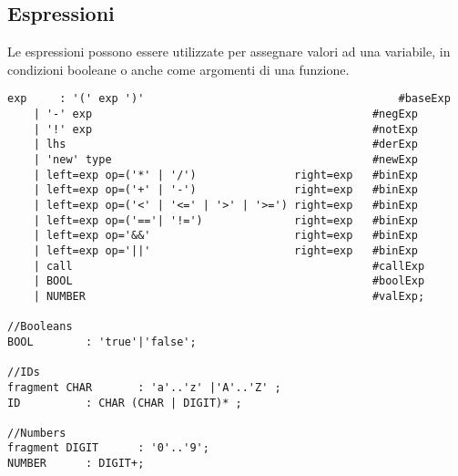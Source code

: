 \documentclass[../../main]{subfiles}
\begin{document}
\subsection{Espressioni}\label{s:espressioni}
Le espressioni possono essere utilizzate per assegnare valori ad una variabile, in condizioni booleane o anche come argomenti di una funzione.
\begin{lstlisting}[style=antlr]
exp	    : '(' exp ')'				                        #baseExp
    | '-' exp					                        #negExp
    | '!' exp                                           #notExp
    | lhs						                        #derExp
    | 'new' type					                    #newExp
    | left=exp op=('*' | '/')               right=exp   #binExp
    | left=exp op=('+' | '-')               right=exp   #binExp
    | left=exp op=('<' | '<=' | '>' | '>=') right=exp   #binExp
    | left=exp op=('=='| '!=')              right=exp   #binExp
    | left=exp op='&&'                      right=exp   #binExp
    | left=exp op='||'                      right=exp   #binExp
    | call                                              #callExp
    | BOOL                                              #boolExp
    | NUMBER					                        #valExp;

//Booleans
BOOL        : 'true'|'false';

//IDs
fragment CHAR 	    : 'a'..'z' |'A'..'Z' ;
ID          : CHAR (CHAR | DIGIT)* ;

//Numbers
fragment DIGIT	    : '0'..'9';
NUMBER      : DIGIT+;
\end{lstlisting}
\end{document}
